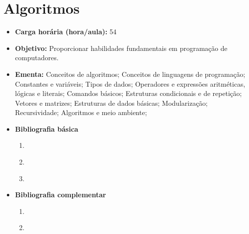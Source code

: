 \documentclass[11pt,fleqn]{book} %
\begin{document}
\newpage
\section{Algoritmos}\label{1_algoritmos}
\begin{itemize}
	\item \textbf{Carga horária (hora/aula):} 54
	\item \textbf{Objetivo:} Proporcionar habilidades fundamentais em programação de computadores.
	\item \textbf{Ementa:} 
	Conceitos de algoritmos;
	Conceitos de linguagens de programação;
	Constantes e variáveis;
	Tipos de dados;
	Operadores e expressões aritméticas, lógicas e literais; 
	Comandos básicos;
	Estruturas condicionais e de repetição;
	Vetores e matrizes;
	Estruturas de dados básicas;
	Modularização;
	Recursividade;
	Algoritmos e meio ambiente;
	\item \textbf{Bibliografia básica}
	\begin{enumerate}
		\item \cite{cormen2002algoritmos}
		\item \cite{silva2007estrutura}
		\item \cite{szwarcfiter1994estruturas}
	\end{enumerate}
	\item \textbf{Bibliografia complementar}
	\begin{enumerate}
		\item \cite{ascencio2010estruturas}
		\item \cite{lafore2004estruturas}
	\end{enumerate}	
\end{itemize}

\newpage
\end{document}
